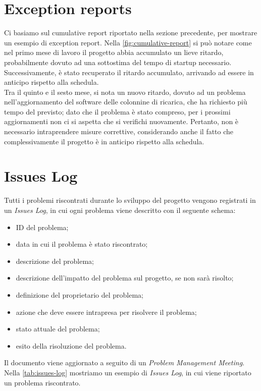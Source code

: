 \documentclass[a4paper,12pt]{article}
\begin{document}
\section{Exception reports}
Ci basiamo sul cumulative report riportato nella sezione precedente, per mostrare un esempio di exception report.
Nella \cref{fig:cumulative-report} si può notare come nel primo mese di lavoro il progetto abbia accumulato un lieve
ritardo, probabilmente dovuto ad una sottostima del tempo di startup necessario. Successivamente, è stato recuperato il
ritardo accumulato, arrivando ad essere in anticipo rispetto alla schedula. \\
Tra il quinto e il sesto mese, si nota un nuovo ritardo, dovuto ad un problema nell'aggiornamento del software delle
colonnine di ricarica, che ha richiesto più tempo del previsto; dato che il problema è stato compreso, per i prossimi
aggiornamenti non ci si aspetta che si verifichi nuovamente. Pertanto, non è necessario intraprendere misure
correttive, considerando anche il fatto che complessivamente il progetto è in anticipo rispetto alla schedula.

\section{Issues Log}
Tutti i problemi riscontrati durante lo sviluppo del progetto vengono registrati in un \textit{Issues Log}, in cui ogni
problema viene descritto con il seguente schema:
\begin{itemize}
    \item ID del problema;
    \item data in cui il problema è stato riscontrato;
    \item descrizione del problema;
    \item descrizione dell'impatto del problema sul progetto, se non sarà risolto;
    \item definizione del proprietario del problema;
    \item azione che deve essere intrapresa per risolvere il problema;
    \item stato attuale del problema;
    \item esito della risoluzione del problema.
\end{itemize}
Il documento viene aggiornato a seguito di un \textit{Problem Management Meeting}.
Nella \cref{tab:issues-log} mostriamo un esempio di \textit{Issues Log}, in cui viene riportato un problema riscontrato.
\end{document}
